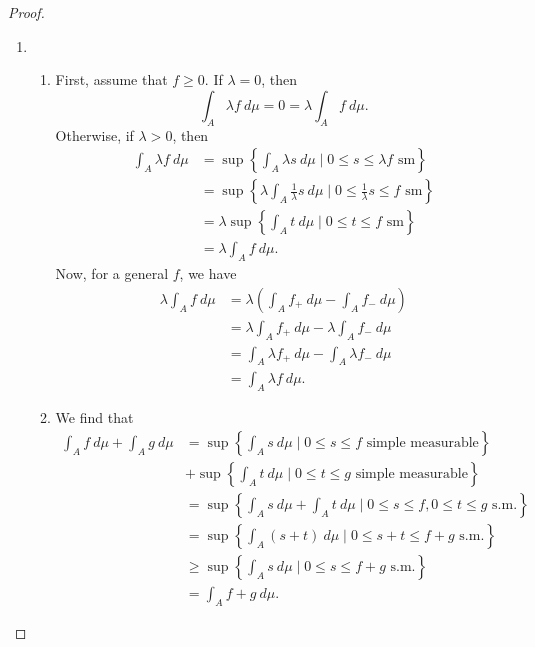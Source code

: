 \documentclass[a4paper, openany]{memoir}
\theoremstyle{definition}
\theoremstyle{plain}
\begin{document}
    \begin{proof}
        \hspace*{0pt}
        \begin{enumerate}
            \item \begin{enumerate}
                \item First, assume that $f \geq 0$. If $\lambda = 0$, then
                \[\int_A \lambda f \ d\mu = 0 = \lambda \int_A f \ d\mu.\]
                Otherwise, if $\lambda > 0$, then
                \begin{align*}
                    \int_A \lambda f \ d\mu &= \sup \left\{\int_A \lambda s \ d\mu \mid 0 \leq s \leq \lambda f \textrm{ sm}\right\} \\
                    &= \sup \left\{\lambda \int_A \frac{1}{\lambda}s \ d\mu \mid 0 \leq \frac{1}{\lambda}s \leq f \textrm{ sm}\right\} \\
                    &= \lambda \sup \left\{\int_A t \ d\mu \mid 0 \leq t \leq f \textrm{ sm}\right\} \\
                    &= \lambda \int_A f \ d\mu.
                \end{align*}
                Now, for a general $f$, we have
                \begin{align*}
                    \lambda \int_A f \ d\mu &= \lambda \left(\int_A f_+ \ d\mu - \int_A f_- \ d\mu\right) \\
                    &= \lambda \int_A f_+ \ d\mu - \lambda \int_A f_- \ d\mu \\
                    &= \int_A \lambda f_+ \ d\mu - \int_A \lambda f_- \ d\mu \\
                    &= \int_A \lambda f \ d\mu.
                \end{align*}
                
                \item We find that
                \begin{align*}
                    \int_A f \ d\mu + \int_A g \ d\mu &= \sup \left\{\int_A s \ d\mu \mid 0 \leq s \leq f \textrm{ simple measurable}\right\} \\
                    &+ \sup \left\{\int_A t \ d\mu \mid 0 \leq t \leq g \textrm{ simple measurable}\right\} \\
                    &= \sup \left\{\int_A s \ d\mu + \int_A t \ d\mu \mid 0 \leq s \leq f, 0 \leq t \leq g  \textrm{ s.m.}\right\} \\
                    &= \sup \left\{\int_A (s + t) \ d\mu \mid 0 \leq s + t \leq f + g \textrm{ s.m.} \right\} \\
                    &\geq \sup \left\{\int_A s \ d\mu \mid 0 \leq s \leq f + g \textrm{ s.m.}\right\} \\
                    &= \int_A f + g \ d\mu.
                \end{align*}
            \end{enumerate}


\end{enumerate}
\end{proof}
\end{document}
